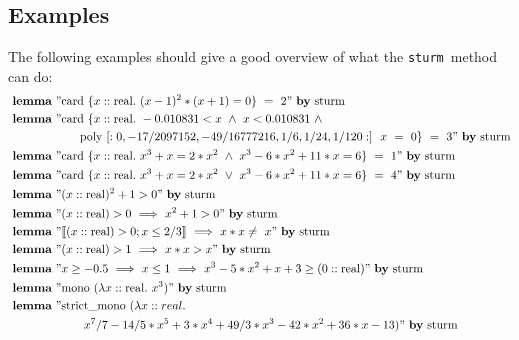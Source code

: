 \documentclass[11pt,a4paper,oneside]{article}
\newcommand{\sturm}{\texttt{sturm}}
\newcommand{\lemma}{\textbf{lemma}}
\newcommand{\card}{\textrm{card}}
\newcommand{\real}{\textrm{real}}
\begin{document}
\subsection{Examples}
The following examples should give a good overview of what the \sturm\ method can do:
\begin{align*}
&\lemma\ "\card\ \{x::\real.\ (x - 1)^2 * (x + 1) = 0\}\  =\  2"\ \textrm{\textbf{by}\ sturm}\\
&\lemma\ "\mathrm{card}\ \{x::\mathrm{real}.\ -0.010831 < x\ \wedge\ x < 0.010831\ \wedge\\
&\hskip20mm \mathrm{poly}\ [:0, -17/2097152, -49/16777216, 1/6, 1/24, 1/120:]\ \ x\ =\ 0\}\  =\  3"\ \textrm{\textbf{by}\ sturm}\\
&\lemma\ "\card\ \{x::\real.\ x^3 + x = 2*x^2\ \wedge\ x^3-6*x^2+11*x=6\}\  =\  1"\ \textrm{\textbf{by}\ sturm}\\
&\lemma\ "\card\ \{x::\real.\ x^3 + x = 2*x^2\ \vee\ x^3-6*x^2+11*x=6\}\  =\  4"\ \textrm{\textbf{by}\ sturm}\\
&\lemma\ "(x::\real)^2+1 > 0"\ \textrm{\textbf{by}\ sturm}\\
&\lemma\ "(x::\real) > 0\ \Longrightarrow\ x^2+1 > 0"\ \textrm{\textbf{by}\ sturm}\\
&\lemma\ "\llbracket (x::\real) > 0; x \leq 2/3\rrbracket\ \Longrightarrow\ x*x \neq\ x"\ \textrm{\textbf{by}\ sturm}\\
&\lemma\ "(x::\real) > 1\ \Longrightarrow\ x*x > x"\ \textrm{\textbf{by}\ sturm}\\
&\lemma\ "x \geq -0.5\ \Longrightarrow\ x \leq 1\ \Longrightarrow\ x^3 - 5*x^2 + x + 3 \geq (0::\mathrm{real})"\ \textrm{\textbf{by}\ sturm}\\
&\lemma\ "\textrm{mono}\ (\lambda x::\mathrm{real}.\ x^3)"\ \textrm{\textbf{by}\ sturm}\\
&\lemma\ "\textrm{strict\_mono}\ (\lambda x::real.\\\
&\hskip20mm\ x^7/7 - 14/5*x^5 + 3*x^4 + 49/3*x^3 - 42*x^2 + 36*x - 13)"\ \textrm{\textbf{by}\ sturm}\\
\end{align*}
\end{document}

